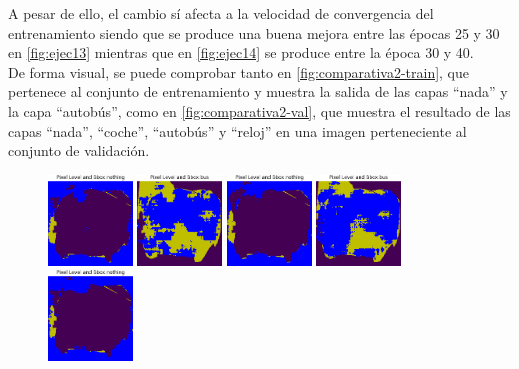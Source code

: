 A pesar de ello, el cambio sí afecta a la velocidad de convergencia del entrenamiento siendo que se produce una buena mejora entre las épocas 25 y 30 en \autoref{fig:ejec13} mientras que en \autoref{fig:ejec14} se produce entre la época 30 y 40.\\
\newpage
De forma visual, se puede comprobar tanto en \autoref{fig:comparativa2-train}, que pertenece al conjunto de entrenamiento y muestra la salida de las capas ``nada'' y la capa ``autobús'', como en \autoref{fig:comparativa2-val}, que muestra el resultado de las capas ``nada'', ``coche'', ``autobús'' y ``reloj'' en una imagen perteneciente al conjunto de validación.\\

\begin{figure}[h!]
  \centering
  \includegraphics[width=0.2\textwidth]{../../modelos-entrenados/unet-conv/ejecucion12/predtrainmid0}
  \vrule
  \includegraphics[width=0.2\textwidth]{../../modelos-entrenados/unet-conv/ejecucion12/predtrainmid6}
  \vrule
  \includegraphics[width=0.2\textwidth]{../../modelos-entrenados/unet-conv-conv/ejecucion14/predtrainmid0}
  \vrule
  \includegraphics[width=0.2\textwidth]{../../modelos-entrenados/unet-conv-conv/ejecucion14/predtrainmid6}
  \vrule
  \includegraphics[width=0.2\textwidth]{../../modelos-entrenados/unet-semconv-conv/ejecucion13/predtrainmid0}

\end{figure}
